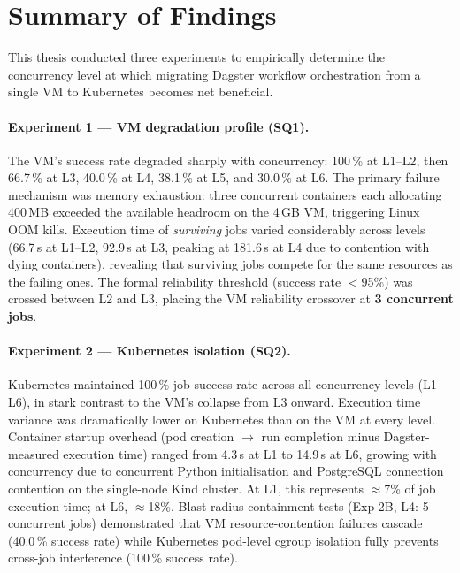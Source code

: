 
\section{Summary of Findings}
\label{sec:summary}

This thesis conducted three experiments to empirically determine the concurrency level at which migrating Dagster workflow orchestration from a single VM to Kubernetes becomes net beneficial.

\paragraph{Experiment 1 --- VM degradation profile (SQ1).}
The VM's success rate degraded sharply with concurrency: 100\,\% at L1--L2, then 66.7\,\% at L3, 40.0\,\% at L4, 38.1\,\% at L5, and 30.0\,\% at L6.
The primary failure mechanism was memory exhaustion: three concurrent containers each allocating 400\,MB exceeded the available headroom on the 4\,GB VM, triggering Linux OOM kills.
Execution time of \emph{surviving} jobs varied considerably across levels (66.7\,s at L1--L2, 92.9\,s at L3, peaking at 181.6\,s at L4 due to contention with dying containers), revealing that surviving jobs compete for the same resources as the failing ones.
The formal reliability threshold (success rate $<$95\%) was crossed between L2 and L3, placing the VM reliability crossover at \textbf{3 concurrent jobs}.

\paragraph{Experiment 2 --- Kubernetes isolation (SQ2).}
Kubernetes maintained 100\,\% job success rate across all concurrency levels (L1--L6), in stark contrast to the VM's collapse from L3 onward.
Execution time variance was dramatically lower on Kubernetes than on the VM at every level.
Container startup overhead (pod creation $\rightarrow$ run completion minus Dagster-measured execution time) ranged from 4.3\,s at L1 to 14.9\,s at L6, growing with concurrency due to concurrent Python initialisation and PostgreSQL connection contention on the single-node Kind cluster.
At L1, this represents $\approx$7\% of job execution time; at L6, $\approx$18\%.
Blast radius containment tests (Exp 2B, L4: 5 concurrent jobs) demonstrated that VM resource-contention failures cascade (40.0\,\% success rate) while Kubernetes pod-level cgroup isolation fully prevents cross-job interference (100\,\% success rate).

